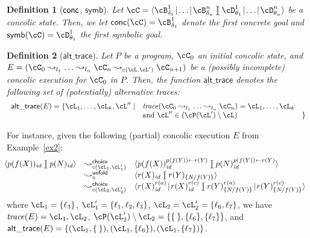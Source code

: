 \documentclass[fleqn]{tlp}
\newtheorem{definition}{Definition} \newtheorem{example}{Example} \newtheorem{lemma}{Lemma} \newtheorem{proposition}{Proposition} \newtheorem{theorem}{Theorem} \newtheorem{corollary}{Corollary}
\newcommand{\symb}{\mathsf{symb}}
\newcommand{\trace}{\mathit{trace}}
\newcommand{\id}{{\mathit{id}}}
\newcommand{\alttrace}{\mathsf{alt\_trace}}
\newcommand{\midd}{\!\mid\!}
\newcommand{\sep}{\mathit{\;]\![\;}}
\def \tuple#1{\langle #1 \rangle}
\begin{document}
\begin{definition}[$\mathsf{conc}$, $\symb$]
\label{defn:conc:symb}
  Let $\cC =
  \tuple{\cB^1_{\delta_1}\midd\ldots\midd\cB^n_{\delta_n}\sep
    \cD^1_{\theta_1}\midd\ldots\midd\cD^n_{\theta_n}}$ be a concolic
  state. Then, we let $\conc(\cC) = \cB^1_{\delta_1}$ denote the
  first concrete goal and $\symb(\cC) = \cD^1_{\theta_1}$ the
  first symbolic goal.
\end{definition}

\begin{definition}[$\alttrace$] \label{def:alttrace}
  Let $P$ be a program, $\cC_0$ an initial concolic state, and $E =
  (\cC_0 \leadsto_{l_1} \ldots \leadsto_{l_n} \cC_n
  \leadsto_{c(\cL,\cL')} \cC_{n+1})$ be a (possibly incomplete)
  concolic execution for $\cC_0$ in $P$.  Then, the function
  $\alttrace$ denotes the following set of (potentially) alternative
  traces:
  \[
  \begin{array}{lll}
  \alttrace(E) = \{ \cL_1,\ldots,\cL_k,\cL'' \mid & \trace(\cC_0
  \leadsto_{l_1} \ldots \leadsto_{l_n} \cC_n) =
  \cL_1,\ldots,\cL_k & \\
  & \mbox{and}~\cL''\in(\cP(\cL')\:\backslash\:\cL) & \}
  \end{array}
  \]
\end{definition}
For instance, given the following (partial) concolic execution $E$
from Example~\ref{ex2}:
\[\hspace{-2ex}
\begin{array}{lll}
\tuple{p(f(X))_\id\sep p(N)_\id} & \leadsto^\mathsf{choice}_{c(\cL_1,\cL'_1)} 
      & \tuple{p(f(X))_\id^{p(f(Y)) \leftarrow r(Y)}\sep
        p(N)_\id^{p(f(Y)) \leftarrow r(Y)}} \\
      & \leadsto^\mathsf{unfold}_\diamond & \tuple{r(X)_\id\sep
        r(Y)_{\{N/f(Y)\}}} \\ 
      & \leadsto^\mathsf{choice}_{c(\cL_2,\cL'_2)} & \tuple{r(X)_\id^{r(a)}\midd
        r(X)_\id^{r(c)}\sep r(Y)_{\{N/f(Y)\}}^{r(a)}\midd
        r(Y)_{\{N/f(Y)\}}^{r(c)}}
    \end{array}
\]
where $\cL_1=\{\ell_3\}$, $\cL'_1=\{\ell_1,\ell_2,\ell_3\}$,
$\cL_2=\cL'_2 = \{\ell_6,\ell_7\}$, we have $\trace(E)=\cL_1,\cL_2$,
$\cP(\cL'_2)\:\backslash\:\cL_2=\{ \{\:\},\{\ell_6\},\{\ell_7\} \}$, and
$\alttrace(E) =\{(\cL_1,\{\:\}),(\cL_1,\{\ell_6\}),(\cL_1,\{\ell_7\})\}$.
\end{document}
